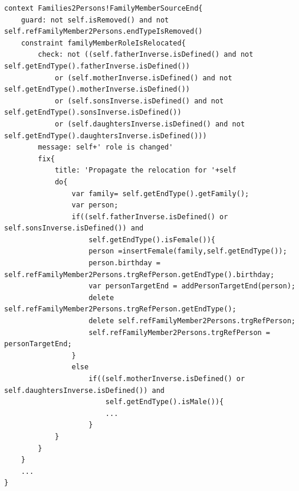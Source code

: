  


\begin{lstlisting}[label={lst:evl}, float=*t, language=evl, caption={Example of an EVL constraint}]
context Families2Persons!FamilyMemberSourceEnd{
    guard: not self.isRemoved() and not self.refFamilyMember2Persons.endTypeIsRemoved()	
    constraint familyMemberRoleIsRelocated{
        check: not ((self.fatherInverse.isDefined() and not self.getEndType().fatherInverse.isDefined())
            or (self.motherInverse.isDefined() and not self.getEndType().motherInverse.isDefined())
            or (self.sonsInverse.isDefined() and not self.getEndType().sonsInverse.isDefined())
            or (self.daughtersInverse.isDefined() and not self.getEndType().daughtersInverse.isDefined()))		
        message: self+' role is changed'
        fix{
            title: 'Propagate the relocation for '+self
            do{
                var family= self.getEndType().getFamily();
                var person;
                if((self.fatherInverse.isDefined() or self.sonsInverse.isDefined()) and
                    self.getEndType().isFemale()){
                    person =insertFemale(family,self.getEndType());
                    person.birthday = self.refFamilyMember2Persons.trgRefPerson.getEndType().birthday;
                    var personTargetEnd = addPersonTargetEnd(person);
                    delete self.refFamilyMember2Persons.trgRefPerson.getEndType();
                    delete self.refFamilyMember2Persons.trgRefPerson;
                    self.refFamilyMember2Persons.trgRefPerson = personTargetEnd;
                }
                else 
                    if((self.motherInverse.isDefined() or self.daughtersInverse.isDefined()) and
                        self.getEndType().isMale()){
                        ...
                    }
            }
        }
    }
    ...
}
\end{lstlisting}

